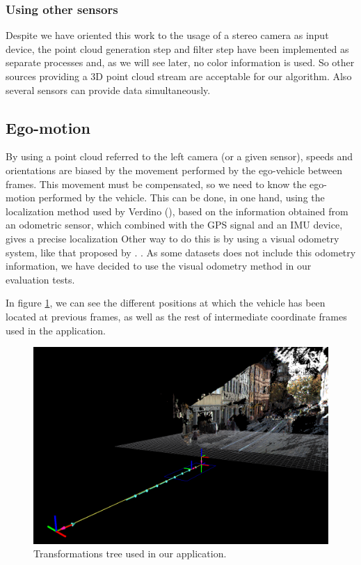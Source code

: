 \subsubsection{Using other sensors}\label{ch:chapter05_01_01_02}

Despite we have oriented this work to the usage of a stereo camera as input device, the point cloud generation step and filter step have been implemented as separate processes and, as we will see later, no color information is used. So other sources providing a 3D point cloud stream are acceptable for our algorithm. Also several sensors can provide data simultaneously.

\subsection{Ego-motion}\label{ch:chapter05_01_02}

By using a point cloud referred to the left camera (or a given sensor), speeds and orientations are biased by the movement performed by the ego-vehicle between frames. This movement must be compensated, so we need to know the ego-motion performed by the vehicle. This can be done, in one hand, using the localization method used by Verdino (\cite{Perea2013mcl}), based on the information obtained from an odometric sensor, which combined with the \acf{GPS} signal and an \acf{IMU} device, gives a precise localization Other way to do this is by using a visual odometry system, like that proposed by \cite{geiger2011stereoscan}. . As some datasets does not include this odometry information, we have decided to use the visual odometry method in our evaluation tests.

In figure \ref{fig:cp05_tfs}, we can see the different positions at which the vehicle has been located at previous frames, as well as the rest of intermediate coordinate frames used in the application.

\begin{figure}[thb]\label{fig:cp05_tfs}
  \centering
  \includegraphics{tfs}
  \caption{Transformations tree used in our application.  }
\end{figure}

